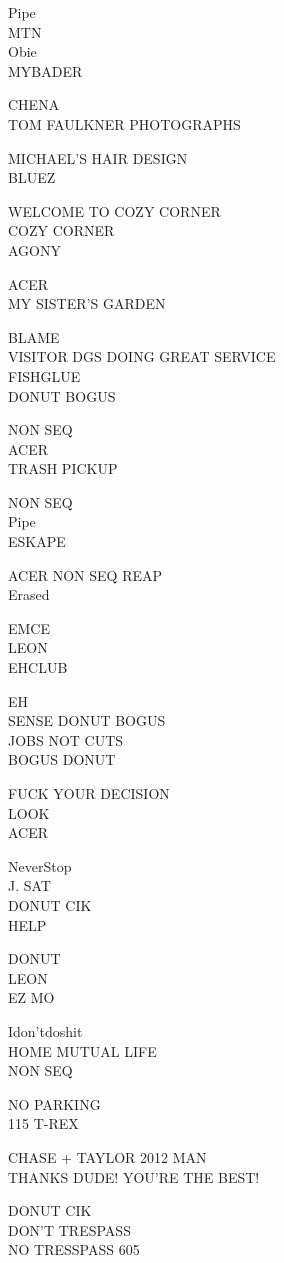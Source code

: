 \documentclass[10pt,letterpaper]{article}
\begin{document}
Pipe\\
MTN\\
Obie\\
MYBADER

CHENA\\
TOM FAULKNER PHOTOGRAPHS

MICHAEL'S HAIR DESIGN\\
BLUEZ

WELCOME TO COZY CORNER\\
COZY CORNER\\
AGONY

ACER\\
MY SISTER'S GARDEN

BLAME\\
VISITOR DGS DOING GREAT SERVICE\\
FISHGLUE\\
DONUT BOGUS

NON SEQ\\
ACER\\
TRASH PICKUP

NON SEQ\\
Pipe\\
ESKAPE

ACER NON SEQ REAP\\
Erased

EMCE\\
LEON\\
EHCLUB

EH\\
SENSE DONUT BOGUS\\
JOBS NOT CUTS\\
BOGUS DONUT

FUCK YOUR DECISION\\
LOOK\\
ACER

NeverStop\\
J. SAT\\
DONUT CIK\\
HELP

DONUT\\
LEON\\
EZ MO

Idon'tdoshit\\
HOME MUTUAL LIFE\\
NON SEQ

NO PARKING\\
115 T{-}REX

CHASE + TAYLOR 2012 MAN\\
THANKS DUDE! YOU'RE THE BEST!

DONUT CIK\\
DON'T TRESPASS\\
NO TRESSPASS 605
\end{document}
